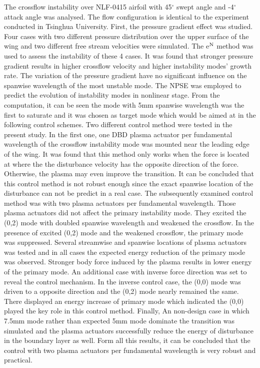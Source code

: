 \documentclass{AIAA}
\begin{document}
The crossflow instability over NLF-0415 airfoil with 45$^\circ $ swept angle and -4$^\circ $ attack angle was analysed. The flow configuration is identical to the experiment conducted in Tsinghua University. First, the pressure gradient effect was studied. Four cases with two different pressure distribution over the upper surface of the wing and two different free stream velocities were simulated. The e$^{\rm N}$ method was used to assess the instability of these 4 cases. It was found that stronger pressure gradient results in higher crossflow velocity and higher instability modes' growth rate. The variation of the pressure gradient have no significant influence on the spanwise wavelength of the most unstable mode. The NPSE was employed to predict the evolution of instability modes in nonlinear stage. From the computation, it can be seen the mode with 5mm spanwise wavelength was the first to saturate and it was chosen as target mode which would be aimed at in the following control schemes. Two different control method were tested in the present study. In the first one, one DBD plasma actuator per fundamental wavelength of the crossflow instability mode was mounted near the leading edge of the wing. It was found that this method only works when the force is located at where the the disturbance velocity has the opposite direction of the force. Otherwise, the plasma may even improve the transition. It can be concluded that this control method is not robust enough since the exact spanwise location of the disturbance can not be predict in a real case. The subsequently examined control method was with two plasma actuators per fundamental wavelength. Those plasma actuators did not affect the primary instability mode. They excited the (0,2) mode with doubled spanwise wavelength and weakened the crossflow. In the presence of excited (0,2) mode and the weakened crossflow, the primary mode was suppressed. Several streamwise and spanwise locations of plasma actuators was tested and in all cases the expected energy reduction of the primary mode was observed. Stronger body force induced by the plasma results in lower energy of the primary mode. An additional case with inverse force direction was set to reveal the control mechanism. In the inverse control case, the (0,0) mode was driven to a opposite direction and the (0,2) mode nearly remained the same. There displayed an energy increase of primary mode which indicated the (0,0) played the key role in this control method. Finally, An non-design case in which 7.5mm mode rather than expected 5mm mode dominate the transition was simulated and the plasma actuators successfully reduce the energy of disturbance in the boundary layer as well. Form all this results, it can be concluded that the control with two plasma actuators per fundamental wavelength is very robust and practical.
\end{document}
